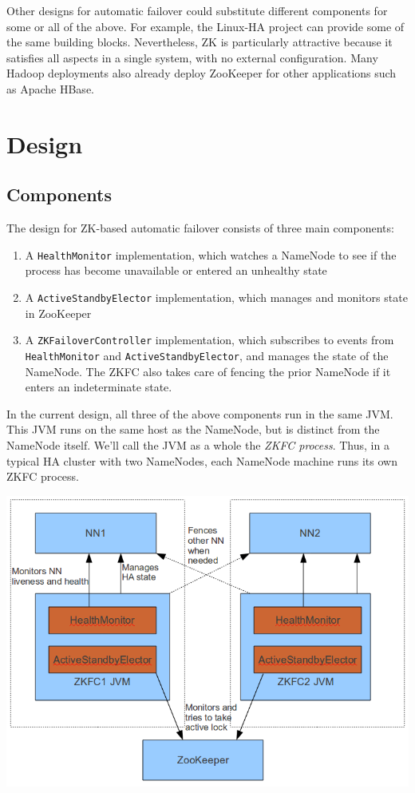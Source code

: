 \documentclass{article}
\begin{document}
Other designs for automatic failover could substitute different components for some or all of the above. For example, the Linux-HA project can provide some of the same building blocks. Nevertheless, ZK is particularly attractive because it satisfies all aspects in a single system, with no external configuration. Many Hadoop deployments also already deploy ZooKeeper for other applications such as Apache HBase.

\section{Design}

\subsection{Components} 
The design for ZK-based automatic failover consists of three main components:
\begin{enumerate}
\item A {\tt HealthMonitor} implementation, which watches a NameNode to see if the process has become unavailable or entered an unhealthy state
\item A {\tt ActiveStandbyElector} implementation, which manages and monitors state in ZooKeeper
\item A {\tt ZKFailoverController} implementation, which subscribes to events from {\tt HealthMonitor} and {\tt ActiveStandbyElector}, and manages the state of the NameNode. The ZKFC also takes care of fencing the prior NameNode if it enters an indeterminate state.
\end{enumerate}

In the current design, all three of the above components run in the same JVM. This JVM runs on the same host as the NameNode, but is distinct from the NameNode itself. We'll call the JVM as a whole the {\em ZKFC process}. Thus, in a typical HA cluster with two NameNodes, each NameNode machine runs its own ZKFC process.

\includegraphics[width=6in]{components.png}
\end{document}
